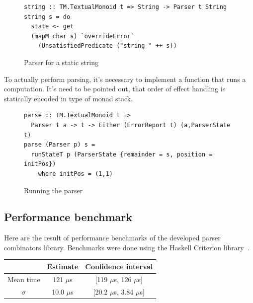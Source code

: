       \begin{figure}[h]
      \begin{lstlisting}
string :: TM.TextualMonoid t => String -> Parser t String
string s = do
  state <- get
  (mapM char s) `overrideError`
    (UnsatisfiedPredicate ("string " ++ s))
      \end{lstlisting}
      \caption{Parser for a static string}
      \label{listing:mtlParserString}
      \end{figure}

      To actually perform parsing, it's necessary to implement a function that
      runs a computation. It's need to be
      pointed out, that order of effect handling is statically encoded in type of
      monad stack.

      \begin{figure}[h]
      \begin{lstlisting}
parse :: TM.TextualMonoid t =>
  Parser t a -> t -> Either (ErrorReport t) (a,ParserState t)
parse (Parser p) s =
  runStateT p (ParserState {remainder = s, position = initPos})
    where initPos = (1,1)
      \end{lstlisting}
      \caption{Running the parser}
      \label{listing:mtlParserParse}
      \end{figure}

      \subsection{Performance benchmark}
      \label{cpt-monads:parsers-bench}

      Here are the result of performance benchmarks of the developed parser
      combinators library. Benchmarks were done using the Haskell Criterion
      library~\cite{criterion}.

      \begin{tabular}{|| c c c||}
        \hline
                      & Estimate & Confidence interval\\
        \hline\hline
        Mean time     & 121 $\mu$s   & [119 $\mu$s, 126 $\mu$s] \\
        $\sigma$      & 10.0 $\mu$s  & [20.2 $\mu$s, 3.84 $\mu$s] \\
        \hline
      \end{tabular}

